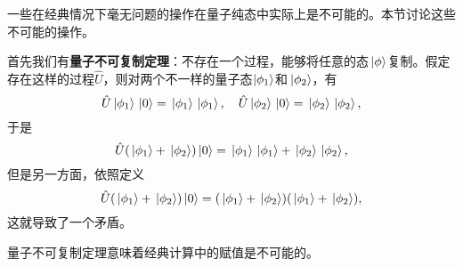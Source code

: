 \documentclass[UTF8, a4paper]{ctexart}
\begin{document}
一些在经典情况下毫无问题的操作在量子纯态中实际上是不可能的。本节讨论这些不可能的操作。

首先我们有\textbf{量子不可复制定理}：不存在一个过程，能够将任意的态$\ket*{\phi}$复制。假定存在这样的过程$\hat{U}$，则对两个不一样的量子态$\ket{\phi_1}$和$\ket*{\phi_2}$，有
\[
    \hat{U} \ket*{\phi_1} \ket*{0} = \ket*{\phi_1} \ket*{\phi_1}, \quad \hat{U} \ket*{\phi_2} \ket*{0} = \ket*{\phi_2} \ket*{\phi_2} ,
\]
于是
\[
    \hat{U} (\ket*{\phi_1} + \ket*{\phi_2}) \ket*{0} = \ket*{\phi_1} \ket*{\phi_1} + \ket*{\phi_2} \ket*{\phi_2},
\]
但是另一方面，依照定义
\[
    \hat{U} (\ket*{\phi_1} + \ket*{\phi_2}) \ket*{0} = (\ket*{\phi_1} + \ket*{\phi_2}) (\ket*{\phi_1} + \ket*{\phi_2}),
\]
这就导致了一个矛盾。

量子不可复制定理意味着经典计算中的赋值是不可能的。
\end{document}
